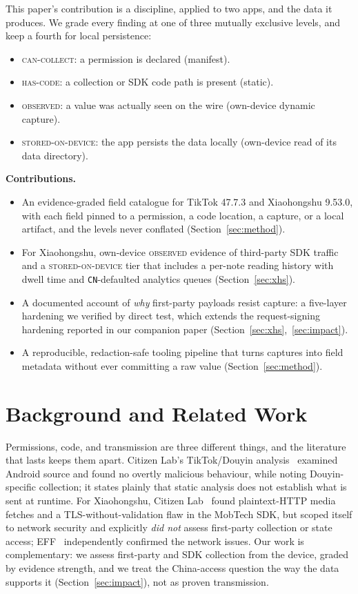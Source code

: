 \documentclass[conference,10pt]{IEEEtran}
\newcommand{\code}[1]{\texttt{\small #1}}
\newcommand{\cancollect}{\textsc{can-collect}}
\newcommand{\hascode}{\textsc{has-code}}
\newcommand{\observed}{\textsc{observed}}
\newcommand{\stored}{\textsc{stored-on-device}}
\begin{document}
This paper's contribution is a discipline, applied to two apps, and the data it produces. We grade every finding at one of three mutually exclusive levels, and keep a fourth for local persistence:

\begin{itemize}
  \item \cancollect{}: a permission is declared (manifest).
  \item \hascode{}: a collection or SDK code path is present (static).
  \item \observed{}: a value was actually seen on the wire (own-device dynamic capture).
  \item \stored{}: the app persists the data locally (own-device read of its data directory).
\end{itemize}

\noindent\textbf{Contributions.}
\begin{itemize}
  \item An evidence-graded field catalogue for TikTok 47.7.3 and Xiaohongshu 9.53.0, with each field pinned to a permission, a code location, a capture, or a local artifact, and the levels never conflated (Section~\ref{sec:method}).
  \item For Xiaohongshu, own-device \observed{} evidence of third-party SDK traffic and a \stored{} tier that includes a per-note reading history with dwell time and \code{CN}-defaulted analytics queues (Section~\ref{sec:xhs}).
  \item A documented account of \emph{why} first-party payloads resist capture: a five-layer hardening we verified by direct test, which extends the request-signing hardening reported in our companion paper (Section~\ref{sec:xhs},~\ref{sec:impact}).
  \item A reproducible, redaction-safe tooling pipeline that turns captures into field metadata without ever committing a raw value (Section~\ref{sec:method}).
\end{itemize}

\section{Background and Related Work}
Permissions, code, and transmission are three different things, and the literature that lasts keeps them apart. Citizen Lab's TikTok/Douyin analysis~\cite{citizenlab2021tiktok} examined Android source and found no overtly malicious behaviour, while noting Douyin-specific collection; it states plainly that static analysis does not establish what is sent at runtime. For Xiaohongshu, Citizen Lab~\cite{citizenlab2025rednote} found plaintext-HTTP media fetches and a TLS-without-validation flaw in the MobTech SDK, but scoped itself to network security and explicitly \emph{did not} assess first-party collection or state access; EFF~\cite{eff2025crimson} independently confirmed the network issues. Our work is complementary: we assess first-party and SDK collection from the device, graded by evidence strength, and we treat the China-access question the way the data supports it (Section~\ref{sec:impact}), not as proven transmission.
\end{document}
